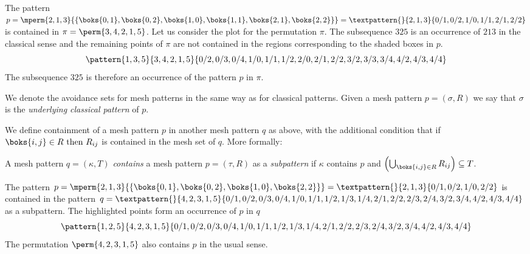 \begin{example}
    The pattern \(p=\mperm{2,1,3}{\{\boks{0,1},\boks{0,2},\boks{1,0},\boks{1,1},\boks{2,1},\boks{2,2}\}}=
    \textpattern{}{ 2, 1, 3 }{ 0/1, 0/2, 1/0, 1/1, 2/1, 2/2 }\) is contained in
    \(\pi = \perm{3,4,2,1,5}\).
    Let us consider the plot for the permutation \(\pi\). The subsequence \(325\) is
    an occurrence of \(213\) in the classical sense and the remaining points of \(\pi\)
    are not contained in the regions corresponding to the shaded boxes in \(p\).
    \begin{equation*}
        \pattern{1,3,5}{3,4,2,1,5}{0/2,0/3,0/4,
                                   1/0,1/1,1/2,
                                   2/0,2/1,2/2,
                                   3/2,3/3,3/4,
                                   4/2,4/3,4/4}
    \end{equation*}
    The subsequence \(325\) is therefore an occurrence of the pattern \(p\) in \(\pi\).
\end{example}

We denote the avoidance sets for mesh patterns in the same way as for
classical patterns. Given a mesh pattern \(p=(\sigma,R)\) we say that \(\sigma\) is the \emph{underlying
classical pattern} of \(p\).

We define containment of a mesh pattern \(p\) in another mesh pattern \(q\) as above,
with the additional condition that if \(\boks{i,j}\in R\text{ then } R_{ij}\) is
contained in the mesh set of \(q\). More formally:

\begin{definition}
A mesh pattern \(q=(\kappa,T)\) \emph{contains} a mesh pattern \(p=(\tau,R)\) as a \emph{subpattern}
if \(\kappa\) contains \(p\) and \(\left(\bigcup_{\boks{i,j}\in R} R_{ij}\right)\subseteq T\).
\end{definition}

\begin{example}
    The pattern \(p=\mperm{2,1,3}{\{\boks{0,1},\boks{0,2},\boks{1,0},\boks{2,2}\}}=
    \textpattern{}{ 2, 1, 3 }{ 0/1, 0/2, 1/0, 2/2 }\) is contained in the pattern
    \(q = \textpattern{}{4,2,3,1,5}{0/1,0/2,0/3,0/4,
                               1/0,1/1,1/2,1/3,1/4,
                               2/1,2/2,2/3,2/4,
                               3/2,3/4,
                               4/2,4/3,4/4} \) as a subpattern.
    The highlighted points form an occurrence of \(p\) in \(q\)
    \begin{equation*}
        \pattern{1,2,5}{4,2,3,1,5}{0/1,0/2,0/3,0/4,
                                   1/0,1/1,1/2,1/3,1/4,
                                   2/1,2/2,2/3,2/4,
                                   3/2,3/4,
                                   4/2,4/3,4/4}
    \end{equation*}
    The permutation \(\perm{4,2,3,1,5}\) also contains \(p\) in the usual sense.
\end{example}
